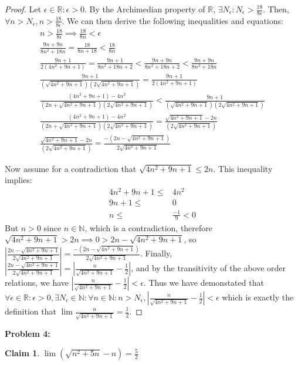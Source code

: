 \documentclass{article}
\newcommand{\reals}{\ensuremath{\mathbb{R}}}
\newcommand{\nats}{\ensuremath{\mathbb{N}}}
\newcommand{\eps}{\ensuremath{\epsilon}}
\newcommand{\neps}{\ensuremath{N_\epsilon}}
\newcommand{\csn}{\sqrt{4n^2+9n+1}}
\newcommand{\dsn}{\sqrt{n^2 + 5n}}
\newtheorem{clm}{Claim}
\begin{document}
\begin{proof}
	Let $\eps \in \reals: \eps > 0$.
	By the Archimedian property of \reals,
	$\exists N_\eps: N_\eps > \frac{18}{8\eps}$.
	Then, $\forall n > N_\eps, n > \frac{18}{8\eps}$.
	We can then derive the following inequalities and equations:
	\begin{align}
		n > \frac{18}{8\eps} \implies \frac{18}{8n} < \eps \\
	      \frac{ 9n + 9n }{8n^2 + 18n} = \frac{18}{8n + 18} < \frac{18}{8n} \\
	      \frac{ 9n + 1 }{2(4n^2 + 9n + 1)} =
	      \frac{ 9n + 1 }{8n^2 + 18n + 2} <
				\frac{ 9n + 9n }{8n^2 + 18n + 2} <
				\frac{ 9n + 9n }{8n^2 + 18n} \\
				\frac{ 9n + 1 }{(\csn)(2\csn)} =
	      \frac{ 9n + 1 }{2(4n^2 + 9n + 1)} \\
	      \frac{ (4n^2 + 9n + 1) -4n^2}{(2n + \csn)(2\csn)} <
				\frac{ 9n + 1 }{(\csn)(2\csn)} \\
				\frac{ (4n^2 + 9n + 1) -4n^2}{(2n + \csn)(2\csn)} =
	      \frac{\csn -2n}{(2\csn)} \\
	      \frac{\csn -2n}{(2\csn)} = \frac{-(2n - \csn)}{2\csn}
	\end{align}

	Now assume for a contradiction that $\csn \le 2n$.
	This inequality implies:
	\begin{align}
		4n^2 + 9n + 1 \le & 4n^2 \\
		9n + 1 \le & 0 \\
		n \le & \frac{-1}{9} < 0
	\end{align}
	But $n > 0$ since $n \in \nats$,
	which is a contradiction,
	therefore $\csn > 2n \implies 0 > 2n - \csn$,
	so $|
	\frac{2n - \csn}{2\csn}
	| =
	\frac{-(2n - \csn)}{2\csn}$.
	Finally,
	$|\frac{2n - \csn}{2\csn}| = |\frac{n}{\csn} - \frac{1}{2}|$,
	and by the transitivity of the above order relations,
	we have $|\frac{n}{\csn} - \frac{1}{2}| < \eps$. 
	Thus we have demonstated that $\forall \eps \in \reals : \eps > 0, \exists \neps \in \nats:
	\forall n \in \nats: n > \neps,
	|\frac{n}{\csn} - \frac{1}{2}| < \eps$
	which is exactly the definition that
	$\lim \frac{n}{\csn} = \frac{1}{2}$.
\end{proof}

\textbf{Problem 4:}

\begin{clm} \label{c4}
	$\lim(\dsn - n) = \frac{5}{2}$
\end{clm}
\end{document}
